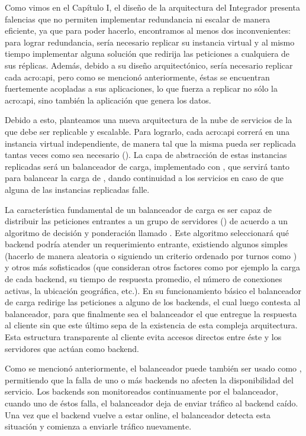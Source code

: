 Como vimos en el Capítulo I, el diseño de la arquitectura del Integrador presenta falencias que no permiten implementar redundancia ni escalar de manera eficiente, ya que para poder hacerlo, encontramos al menos dos inconvenientes: para lograr redundancia, sería necesario replicar su instancia virtual y al mismo tiempo implementar alguna solución que redirija las peticiones a cualquiera de sus réplicas.  Además, debido a su diseño arquitectónico, sería necesario replicar cada \gls{acro:api}, pero como se mencionó anteriormente, éstas se encuentran fuertemente acopladas a sus aplicaciones, lo que fuerza a replicar no sólo la \gls{acro:api}, sino también la aplicación que genera los datos.

Debido a esto, planteamos una nueva arquitectura de la nube de servicios de la {\unlp} que debe ser replicable y escalable. Para lograrlo, cada \gls{acro:api} correrá en una instancia virtual independiente, de manera tal que la misma pueda ser replicada tantas veces como sea necesario (). La capa de abstracción de estas instancias replicadas será un balanceador de carga, implementado con , que servirá tanto para balancear la carga de , dando continuidad a los servicios en caso de que alguna de las instancias replicadas falle.

La característica fundamental de un balanceador de carga es ser capaz de distribuir las peticiones entrantes a un grupo de servidores () de acuerdo a un algoritmo de decisión y ponderación llamado . Este algoritmo seleccionará qué backend podría atender un requerimiento entrante, existiendo algunos simples (hacerlo de manera aleatoria o siguiendo un criterio ordenado por turnos como ) y otros más sofisticados (que consideran otros factores como por ejemplo la carga de cada backend, su tiempo de respuesta promedio, el número de conexiones activas, la ubicación geográfica, etc.). En su funcionamiento básico el balanceador de carga redirige las peticiones a alguno de los backends, el cual luego contesta al balanceador, para que finalmente sea el balanceador el que entregue la respuesta al cliente sin que este último sepa de la existencia de esta compleja arquitectura. Esta estructura transparente al cliente evita accesos directos entre éste y los servidores que actúan como backend.

Como se mencionó anteriormente, el balanceador puede también ser usado como , permitiendo que la falla de uno o más backends no afecten la disponibilidad del servicio. Los backends son monitoreados continuamente por el balanceador, cuando uno de éstos falla, el balanceador deja de enviar tráfico al backend caído. Una vez que el backend vuelve a estar online, el balanceador detecta esta situación y comienza a enviarle tráfico nuevamente.

